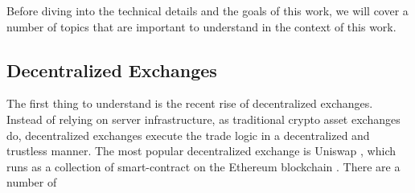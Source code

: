 \documentclass[../../thesis.tex]{subfiles}
\begin{document}




Before diving into the technical details and the goals of this work, we will cover a number of topics that are important to understand in the context of this work. 
\subsection{Decentralized Exchanges}
The first thing to understand is the recent rise of decentralized exchanges. Instead of relying on server infrastructure, as traditional crypto asset exchanges do, decentralized exchanges execute the trade logic in a decentralized and trustless manner. The most popular decentralized exchange is Uniswap \cite{adams2020uniswap}, which runs as a collection of smart-contract on the Ethereum blockchain \cite{wood2014ethereum}. There are a number of 
\end{document}
